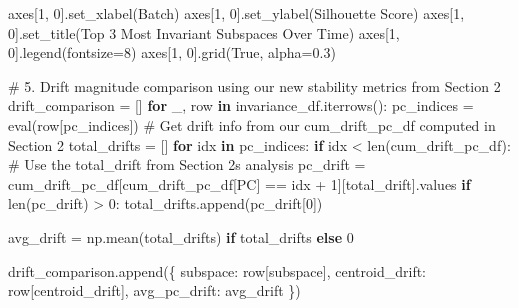 \documentclass[
  letterpaper,
  DIV=11,
  numbers=noendperiod]{scrartcl}
\newenvironment{Shaded}{\begin{snugshade}}{\end{snugshade}}
\newcommand{\BuiltInTok}[1]{\textcolor[rgb]{0.00,0.23,0.31}{#1}}
\newcommand{\CommentTok}[1]{\textcolor[rgb]{0.37,0.37,0.37}{#1}}
\newcommand{\ControlFlowTok}[1]{\textcolor[rgb]{0.00,0.23,0.31}{\textbf{#1}}}
\newcommand{\DecValTok}[1]{\textcolor[rgb]{0.68,0.00,0.00}{#1}}
\newcommand{\FloatTok}[1]{\textcolor[rgb]{0.68,0.00,0.00}{#1}}
\newcommand{\KeywordTok}[1]{\textcolor[rgb]{0.00,0.23,0.31}{\textbf{#1}}}
\newcommand{\NormalTok}[1]{\textcolor[rgb]{0.00,0.23,0.31}{#1}}
\newcommand{\OperatorTok}[1]{\textcolor[rgb]{0.37,0.37,0.37}{#1}}
\newcommand{\StringTok}[1]{\textcolor[rgb]{0.13,0.47,0.30}{#1}}
\newcommand{\VariableTok}[1]{\textcolor[rgb]{0.07,0.07,0.07}{#1}}
\renewenvironment{Shaded}{%
  \begin{tcolorbox}[%
    enhanced,%
    colback=codebg,%
    colframe=codebg,%
    borderline west={3pt}{0pt}{sectionblue},%
    fontupper=\small\ttfamily,%
    boxrule=0pt,%
    arc=0pt,%
    boxsep=5pt,%
    left=2mm,%
    right=2mm,%
    top=2mm,%
    bottom=2mm%
  ]%
}{%
  \end{tcolorbox}%
}
\begin{document}
\begin{Shaded}
\begin{Highlighting}[]
\NormalTok{axes[}\DecValTok{1}\NormalTok{, }\DecValTok{0}\NormalTok{].set\_xlabel(}\StringTok{\textquotesingle{}Batch\textquotesingle{}}\NormalTok{)}
\NormalTok{axes[}\DecValTok{1}\NormalTok{, }\DecValTok{0}\NormalTok{].set\_ylabel(}\StringTok{\textquotesingle{}Silhouette Score\textquotesingle{}}\NormalTok{)}
\NormalTok{axes[}\DecValTok{1}\NormalTok{, }\DecValTok{0}\NormalTok{].set\_title(}\StringTok{\textquotesingle{}Top 3 Most Invariant Subspaces Over Time\textquotesingle{}}\NormalTok{)}
\NormalTok{axes[}\DecValTok{1}\NormalTok{, }\DecValTok{0}\NormalTok{].legend(fontsize}\OperatorTok{=}\DecValTok{8}\NormalTok{)}
\NormalTok{axes[}\DecValTok{1}\NormalTok{, }\DecValTok{0}\NormalTok{].grid(}\VariableTok{True}\NormalTok{, alpha}\OperatorTok{=}\FloatTok{0.3}\NormalTok{)}

\CommentTok{\# 5. Drift magnitude comparison using our new stability metrics from Section 2}
\NormalTok{drift\_comparison }\OperatorTok{=}\NormalTok{ []}
\ControlFlowTok{for}\NormalTok{ \_, row }\KeywordTok{in}\NormalTok{ invariance\_df.iterrows():}
\NormalTok{    pc\_indices }\OperatorTok{=} \BuiltInTok{eval}\NormalTok{(row[}\StringTok{\textquotesingle{}pc\_indices\textquotesingle{}}\NormalTok{])}
    \CommentTok{\# Get drift info from our cum\_drift\_pc\_df computed in Section 2}
\NormalTok{    total\_drifts }\OperatorTok{=}\NormalTok{ []}
    \ControlFlowTok{for}\NormalTok{ idx }\KeywordTok{in}\NormalTok{ pc\_indices:}
        \ControlFlowTok{if}\NormalTok{ idx }\OperatorTok{\textless{}} \BuiltInTok{len}\NormalTok{(cum\_drift\_pc\_df):}
            \CommentTok{\# Use the total\_drift from Section 2\textquotesingle{}s analysis}
\NormalTok{            pc\_drift }\OperatorTok{=}\NormalTok{ cum\_drift\_pc\_df[cum\_drift\_pc\_df[}\StringTok{\textquotesingle{}PC\textquotesingle{}}\NormalTok{] }\OperatorTok{==}\NormalTok{ idx }\OperatorTok{+} \DecValTok{1}\NormalTok{][}\StringTok{\textquotesingle{}total\_drift\textquotesingle{}}\NormalTok{].values}
            \ControlFlowTok{if} \BuiltInTok{len}\NormalTok{(pc\_drift) }\OperatorTok{\textgreater{}} \DecValTok{0}\NormalTok{:}
\NormalTok{                total\_drifts.append(pc\_drift[}\DecValTok{0}\NormalTok{])}
    
\NormalTok{    avg\_drift }\OperatorTok{=}\NormalTok{ np.mean(total\_drifts) }\ControlFlowTok{if}\NormalTok{ total\_drifts }\ControlFlowTok{else} \DecValTok{0}
    
\NormalTok{    drift\_comparison.append(\{}
        \StringTok{\textquotesingle{}subspace\textquotesingle{}}\NormalTok{: row[}\StringTok{\textquotesingle{}subspace\textquotesingle{}}\NormalTok{],}
        \StringTok{\textquotesingle{}centroid\_drift\textquotesingle{}}\NormalTok{: row[}\StringTok{\textquotesingle{}centroid\_drift\textquotesingle{}}\NormalTok{],}
        \StringTok{\textquotesingle{}avg\_pc\_drift\textquotesingle{}}\NormalTok{: avg\_drift}
\NormalTok{    \})}


\end{Highlighting}
\end{Shaded}
\end{document}
